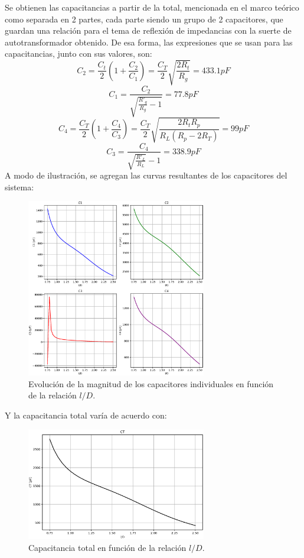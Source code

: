 \documentclass{article}
\begin{document}
\noindent Se obtienen las capacitancias a partir de la total, mencionada en el marco teórico como separada en 2 partes, cada parte siendo un grupo de 2 capacitores, que guardan una relación para el tema de reflexión de impedancias con la suerte de autotransformador obtenido. De esa forma, las expresiones que se usan para las capacitancias, junto con sus valores, son:
\begin{equation*}
    C_2 = \frac{C_t}{2} \left( 1 + \frac{C_2}{C_1} \right) = \frac{C_T}{2} \sqrt{\frac{2R_t}{R_g}} = 433.1 pF
\end{equation*}
\begin{equation*}
    C_1 = \frac{C_2}{\sqrt{\frac{R'_g}{R_g}-1}} = 77.8 pF
\end{equation*}
\begin{equation*}
    C_4 = \frac{C_T}{2} \left( 1 + \frac{C_4}{C_3} \right) = \frac{C_T}{2} \sqrt{\frac{2R_tR_p}{R_L(R_p - 2R_T)}}  = 99 pF
\end{equation*}
\begin{equation*}
    C_3 = \frac{C_4}{\sqrt{\frac{R'_L}{R_L}}- 1} = 338.9 pF
\end{equation*}
A modo de ilustración, se agregan las curvas resultantes de los capacitores del sistema:
\begin{figure}[H]
\centering
\includegraphics[width=0.7\textwidth]{./img/figura13.eps}
\caption{Evolución de la magnitud de los capacitores individuales en función de la relación $l/D$.}
\label{fig:circuito13}
\end{figure}
\newpage
\noindent Y la capacitancia total varía de acuerdo con:
\begin{figure}[H]
\centering
\includegraphics[width=0.7\textwidth]{./img/figura14.eps}
\caption{Capacitancia total en función de la relación $l/D$.}
\label{fig:circuito14}
\end{figure}
\end{document}
